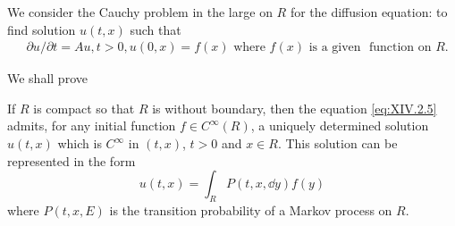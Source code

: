 We consider the Cauchy problem in the large on $R$ for the diffusion equation: to find solution $u(t, x)$ such that 
\begin{equation}\label{eq:XIV.2.5}
\begin{aligned}
&\partial u / \partial t  = A u, t > 0, u (0, x) = f (x) \text{ where } f (x) \text{ is a given } \text{ function on } R.
\end{aligned}
\end{equation}

We shall prove 

\begin{theoremu} If $R$ is compact so that $R$ is without boundary, then the equation \eqref{eq:XIV.2.5} admits, for any initial function $f \in C^{\infty}(R)$, a uniquely determined solution $u(t, x)$ which is $C^{\infty}$ in $(t, x)$, $t > 0$ and $x \in R$. This solution can be represented in the form 
\begin{equation}\label{eq:XIV.2.6}
u (t, x) = \int_{R} P (t, x, \dd y) f (y)
\end{equation}
where $P(t, x, E)$ is the transition probability of a Markov process on $R$. \end{theoremu}

